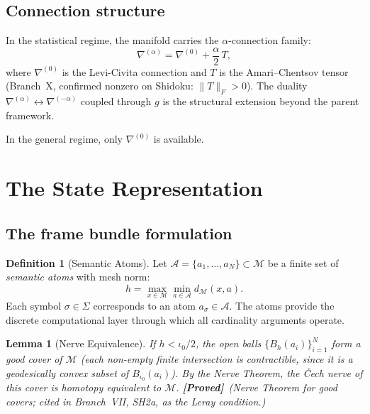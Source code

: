 \documentclass[11pt,a4paper]{article}
\newtheorem{lemma}[theorem]{Lemma}
\theoremstyle{definition}
\newtheorem{definition}[theorem]{Definition}
\theoremstyle{remark}
\newcommand{\statusproved}{\textcolor{green!50!black}{\textbf{[Proved]}}}
\begin{document}
\subsection{Connection structure}\label{sec:connections}

In the statistical regime, the manifold carries the $\alpha$-connection 
family:
\begin{equation}\label{eq:alpha_connection}
    \nabla^{(\alpha)} = \nabla^{(0)} + \frac{\alpha}{2}\, T,
\end{equation}
where $\nabla^{(0)}$ is the Levi-Civita connection and $T$ is the 
Amari--Chentsov tensor (Branch~X, confirmed nonzero on Shidoku: 
$\|T\|_F > 0$). The duality $\nabla^{(\alpha)} \leftrightarrow 
\nabla^{(-\alpha)}$ coupled through $g$ is the structural extension 
beyond the parent framework.

In the general regime, only $\nabla^{(0)}$ is available.


\section{The State Representation}\label{sec:state}

\subsection{The frame bundle formulation}\label{sec:frame_bundle}

\begin{definition}[Semantic Atoms]\label{def:atoms}
Let $\mathcal{A} = \{a_1, \ldots, a_N\} \subset \mathcal{M}$ be 
a finite set of \emph{semantic atoms} with mesh norm:
\begin{equation}\label{eq:mesh}
    h = \max_{x \in \mathcal{M}} \min_{a \in \mathcal{A}} 
    d_{\mathcal{M}}(x, a).
\end{equation}
Each symbol $\sigma \in \Sigma$ corresponds to an atom 
$a_\sigma \in \mathcal{A}$. The atoms provide the discrete 
computational layer through which all cardinality arguments 
operate.
\end{definition}

\begin{lemma}[Nerve Equivalence]\label{lem:nerve}
If $h < \iota_0 / 2$, the open balls $\{B_h(a_i)\}_{i=1}^N$ 
form a good cover of $\mathcal{M}$ (each non-empty finite 
intersection is contractible, since it is a geodesically convex 
subset of $B_{\iota_0}(a_i)$). By the Nerve Theorem, the 
\v{C}ech nerve of this cover is homotopy equivalent to 
$\mathcal{M}$. \statusproved\ (Nerve Theorem for good covers; 
cited in Branch~VII, SH2a, as the Leray condition.)
\end{lemma}
\end{document}
